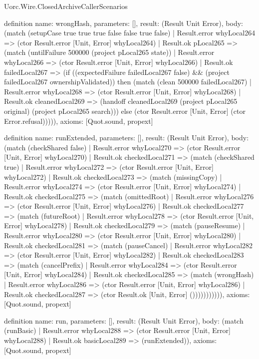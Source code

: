 \begin{lexlean}{Uorc.Wire.ClosedArchiveCallerScenarios}
\begin{semanticmodule}
definition{
  name: wrongHash,
  parameters: [],
  result: (Result Unit Error),
  body: (match (setupCase true true true false false true false)
    | Result.error whyLocal264 => (ctor Result.error [Unit, Error] whyLocal264)
    | Result.ok pLocal265 => (match (untilFailure 500000 (project pLocal265 state))
      | Result.error whyLocal266 => (ctor Result.error [Unit, Error] whyLocal266)
      | Result.ok failedLocal267 => (if ((expectedFailure failedLocal267 false) && (project failedLocal267 ownershipValidated)) then (match (clean 500000 failedLocal267)
        | Result.error whyLocal268 => (ctor Result.error [Unit, Error] whyLocal268)
        | Result.ok cleanedLocal269 => (handoff cleanedLocal269 (project pLocal265 original) (project pLocal265 search))) else (ctor Result.error [Unit, Error] (ctor Error.refusal))))),
  axioms: [Quot.sound, propext]
}

definition{
  name: runExtended,
  parameters: [],
  result: (Result Unit Error),
  body: (match (checkShared false)
    | Result.error whyLocal270 => (ctor Result.error [Unit, Error] whyLocal270)
    | Result.ok checkedLocal271 => (match (checkShared true)
      | Result.error whyLocal272 => (ctor Result.error [Unit, Error] whyLocal272)
      | Result.ok checkedLocal273 => (match (missingCopy)
        | Result.error whyLocal274 => (ctor Result.error [Unit, Error] whyLocal274)
        | Result.ok checkedLocal275 => (match (omittedRoot)
          | Result.error whyLocal276 => (ctor Result.error [Unit, Error] whyLocal276)
          | Result.ok checkedLocal277 => (match (futureRoot)
            | Result.error whyLocal278 => (ctor Result.error [Unit, Error] whyLocal278)
            | Result.ok checkedLocal279 => (match (pauseResume)
              | Result.error whyLocal280 => (ctor Result.error [Unit, Error] whyLocal280)
              | Result.ok checkedLocal281 => (match (pauseCancel)
                | Result.error whyLocal282 => (ctor Result.error [Unit, Error] whyLocal282)
                | Result.ok checkedLocal283 => (match (cancelPrefix)
                  | Result.error whyLocal284 => (ctor Result.error [Unit, Error] whyLocal284)
                  | Result.ok checkedLocal285 => (match (wrongHash)
                    | Result.error whyLocal286 => (ctor Result.error [Unit, Error] whyLocal286)
                    | Result.ok checkedLocal287 => (ctor Result.ok [Unit, Error] ())))))))))),
  axioms: [Quot.sound, propext]
}

definition{
  name: run,
  parameters: [],
  result: (Result Unit Error),
  body: (match (runBasic)
    | Result.error whyLocal288 => (ctor Result.error [Unit, Error] whyLocal288)
    | Result.ok basicLocal289 => (runExtended)),
  axioms: [Quot.sound, propext]
}


\end{semanticmodule}
\end{lexlean}
